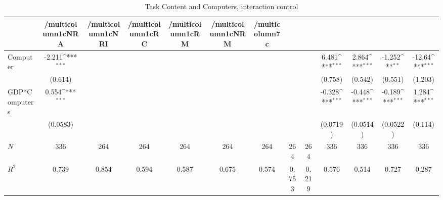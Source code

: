 \begin{table}[htbp]\centering
\def\sym#1{\ifmmode^{#1}\else\(^{#1}\)\fi}
\caption{Task Content and Computers, interaction control }
\begin{tabular}{l*{12}{c}}
\hline\hline
            &/multicolumn{1}{c}{NRA}&/multicolumn{1}{c}{NRI}&/multicolumn{1}{c}{RC}&/multicolumn{1}{c}{RM}&/multicolumn{1}{c}{NRM}&/multicolumn{7}{c}{}                                                                                                                                     \\
\hline
Computer    &      -2.211\sym{***}&                     &                     &                     &                     &                     &                     &                     &       6.481\sym{***}&       2.864\sym{***}&      -1.252\sym{**} &      -12.64\sym{***}\\
            &     (0.614)         &                     &                     &                     &                     &                     &                     &                     &     (0.758)         &     (0.542)         &     (0.551)         &     (1.203)         \\
[1em]
GDP*Computers&       0.554\sym{***}&                     &                     &                     &                     &                     &                     &                     &      -0.328\sym{***}&      -0.448\sym{***}&      -0.189\sym{***}&       1.284\sym{***}\\
            &    (0.0583)         &                     &                     &                     &                     &                     &                     &                     &    (0.0719)         &    (0.0514)         &    (0.0522)         &     (0.114)         \\
\hline
\(N\)       &         336         &         264         &         264         &         264         &         264         &         264         &         264         &         264         &         336         &         336         &         336         &         336         \\
\(R^{2}\)   &       0.739         &       0.854         &       0.594         &       0.587         &       0.675         &       0.574         &       0.753         &       0.219         &       0.576         &       0.514         &       0.727         &       0.287         \\
\hline\hline
\end{tabular}
\end{table}
